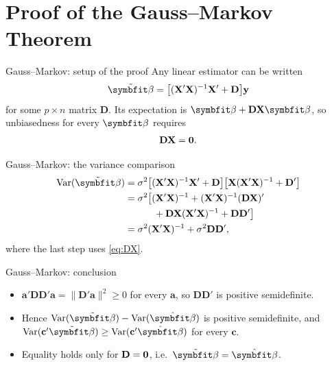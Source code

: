 \appendix


\section{Proof of the Gauss--Markov Theorem}


\begin{frame}{Gauss--Markov: setup of the proof}
    Any linear estimator can be written
    \[
    \tilde{\bbeta} = \big[(\bX'\bX)^{-1}\bX' + \mathbf{D}\big]\by
    \]
    for some $p\times n$ matrix $\mathbf{D}$. Its expectation is $\bbeta + \mathbf{D}\bX\bbeta$, so unbiasedness for every $\bbeta$ requires
    \begin{align}
        \mathbf{D}\mathbf{X} = \mathbf{0}. \label{eq:DX}
    \end{align}
\end{frame}


\begin{frame}{Gauss--Markov: the variance comparison}
    \begin{align*}
        \Var(\tilde{\bbeta}) &= \sigma^2\big[(\bX'\bX)^{-1}\bX' + \mathbf{D}\big]\big[\bX(\bX'\bX)^{-1} + \mathbf{D}'\big] \\
        &= \sigma^2\big[(\bX'\bX)^{-1} + (\bX'\bX)^{-1}(\mathbf{D}\bX)' \\
        &\qquad\quad + \mathbf{D}\bX(\bX'\bX)^{-1} + \mathbf{D}\mathbf{D}'\big] \\
        &= \sigma^2(\bX'\bX)^{-1} + \sigma^2\mathbf{D}\mathbf{D}',
    \end{align*}
    where the last step uses \eqref{eq:DX}.
\end{frame}


\begin{frame}{Gauss--Markov: conclusion}
    \begin{itemize}
        \item $\mathbf{a}'\mathbf{D}\mathbf{D}'\mathbf{a} = \|\mathbf{D}'\mathbf{a}\|^2\ge 0$ for every $\mathbf{a}$, so $\mathbf{D}\mathbf{D}'$ is positive semidefinite.
        \item Hence $\Var(\tilde{\bbeta}) - \Var(\hat{\bbeta})$ is positive semidefinite, and $\Var(\mathbf{c}'\tilde{\bbeta})\ge\Var(\mathbf{c}'\hat{\bbeta})$ for every $\mathbf{c}$.
        \item Equality holds only for $\mathbf{D}=\mathbf{0}$, i.e.\ $\tilde{\bbeta}=\hat{\bbeta}$.
    \end{itemize}
\end{frame}